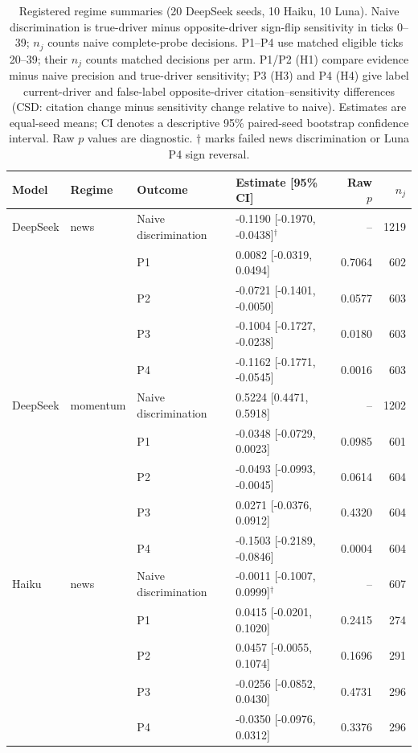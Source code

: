 \begin{table}[tbp]
\caption{Registered regime summaries (20 DeepSeek seeds, 10 Haiku, 10 Luna). Naive discrimination is true-driver minus opposite-driver sign-flip sensitivity in ticks 0--39; $n_j$ counts naive complete-probe decisions. P1--P4 use matched eligible ticks 20--39; their $n_j$ counts matched decisions per arm. P1/P2 (H1) compare evidence minus naive precision and true-driver sensitivity; P3 (H3) and P4 (H4) give label current-driver and false-label opposite-driver citation--sensitivity differences (CSD: citation change minus sensitivity change relative to naive). Estimates are equal-seed means; CI denotes a descriptive 95\% paired-seed bootstrap confidence interval. Raw $p$ values are diagnostic. $\dagger$ marks failed news discrimination or Luna P4 sign reversal.}
\label{tab:regime}
\centering\footnotesize
\setlength{\tabcolsep}{3pt}
\renewcommand{\arraystretch}{1.0}
\begin{tabularx}{\linewidth}{@{}lllXrr@{}}
\toprule
Model & Regime & Outcome & Estimate [95\% CI] & Raw $p$ & $n_j$ \\
\midrule
DeepSeek & news & Naive discrimination & -0.1190 [-0.1970, -0.0438]$^{\dagger}$ & -- & 1219 \\
 &  & P1 & 0.0082 [-0.0319, 0.0494] & 0.7064 & 602 \\
 &  & P2 & -0.0721 [-0.1401, -0.0050] & 0.0577 & 603 \\
 &  & P3 & -0.1004 [-0.1727, -0.0238] & 0.0180 & 603 \\
 &  & P4 & -0.1162 [-0.1771, -0.0545] & 0.0016 & 603 \\
\midrule
DeepSeek & momentum & Naive discrimination & 0.5224 [0.4471, 0.5918] & -- & 1202 \\
 &  & P1 & -0.0348 [-0.0729, 0.0023] & 0.0985 & 601 \\
 &  & P2 & -0.0493 [-0.0993, -0.0045] & 0.0614 & 604 \\
 &  & P3 & 0.0271 [-0.0376, 0.0912] & 0.4320 & 604 \\
 &  & P4 & -0.1503 [-0.2189, -0.0846] & 0.0004 & 604 \\
\midrule
Haiku & news & Naive discrimination & -0.0011 [-0.1007, 0.0999]$^{\dagger}$ & -- & 607 \\
 &  & P1 & 0.0415 [-0.0201, 0.1020] & 0.2415 & 274 \\
 &  & P2 & 0.0457 [-0.0055, 0.1074] & 0.1696 & 291 \\
 &  & P3 & -0.0256 [-0.0852, 0.0430] & 0.4731 & 296 \\
 &  & P4 & -0.0350 [-0.0976, 0.0312] & 0.3376 & 296 \\

\end{tabularx}
\end{table}
